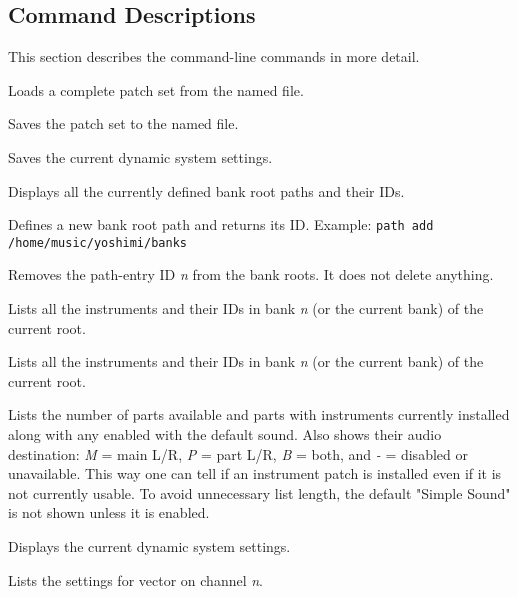 \subsection{Command Descriptions}
\label{subsec:command_line_command_descriptions}

   This section describes the command-line commands in more detail.

   \setcounter{ItemCounter}{0}      %

      Loads a complete patch set from the named file.

      Saves the patch set to the named file.

      Saves the current dynamic system settings.

      Displays all the currently defined bank root paths and their IDs.

      Defines a new bank root path and returns its ID.
      Example: \texttt{path add /home/music/yoshimi/banks}

      Removes the path-entry ID \textsl{n} from the bank roots. 
      It does not delete anything.

      Lists all the instruments and their IDs in bank \textsl{n} (or the
      current bank) of the current root.

      Lists all the instruments and their IDs in bank \textsl{n}
      (or the current bank) of the current root.

      Lists the number of parts available and parts with instruments
      currently installed along with any enabled with the default sound.
      Also shows their audio destination:
      \textsl{M} = main L/R, \textsl{P} = part L/R, \textsl{B} = both, and
      \textsl{-} = disabled or unavailable.
      This way one can tell if an instrument patch is installed even if it is
      not currently usable.
      To avoid unnecessary list length, the default "Simple Sound" is not shown
      unless it is enabled.

      Displays the current dynamic system settings.

      Lists the settings for vector on channel \textsl{n}.

